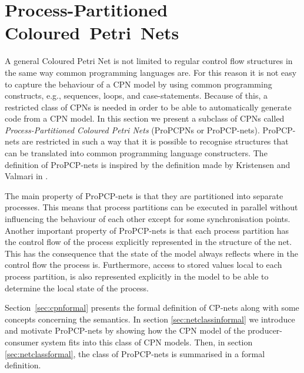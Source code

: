 \chapter{Process-Partitioned Coloured~Petri~Nets}
\label{chap:netclass}

A general Coloured Petri Net is not limited to regular control flow structures in the same way common programming languages are. For this reason it is not easy to capture the behaviour of a CPN model by using common programming constructs, e.g., sequences, loops, and case-statements. Because of this, a restricted class of CPNs is needed in order to be able to automatically generate code from a CPN model. In this section we present a subclass of CPNs called \emph{Process-Partitioned Coloured Petri Nets} (ProPCPNs or ProPCP-nets). ProPCP-nets are restricted in such a way that it is possible to recognise structures that can be translated into common programming language constructers. The definition of ProPCP-nets is inspired by the definition made by Kristensen and Valmari in \cite{RefWorks:82}.

The main property of ProPCP-nets is that they are partitioned into separate processes. This means that process partitions can be executed in parallel without influencing the behaviour of each other except for some synchronisation points. Another important property of ProPCP-nets is that each process partition has the control flow of the process explicitly represented in the structure of the net. This has the consequence that the state of the model always reflects where in the control flow the process is. Furthermore, access to stored values local to each process partition, is also represented explicitly in the model to be able to determine the local state of the process.

Section~\ref{sec:cpnformal} presents the formal definition of CP-nets along with some concepts concerning the semantics. In section \ref{sec:netclassinformal} we introduce and motivate ProPCP-nets by showing how the CPN model of the producer-consumer system fits into this class of CPN models. Then, in section \ref{sec:netclassformal}, the class of ProPCP-nets is summarised in a formal definition.





